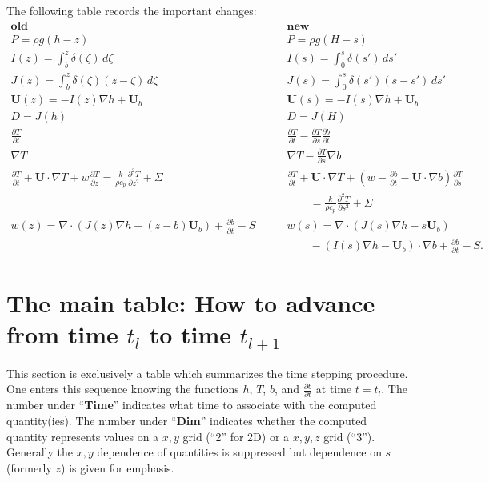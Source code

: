 \documentclass{amsart}%
\theoremstyle{plain}
\theoremstyle{definition}
\theoremstyle{remark}
\newcommand{\ddt}[1]{\ensuremath{\frac{\partial #1}{\partial t}}}
\newcommand{\ddz}[1]{\ensuremath{\frac{\partial #1}{\partial z}}}
\newcommand{\dds}[1]{\ensuremath{\frac{\partial #1}{\partial s}}}
\newcommand{\dddsds}[1]{\ensuremath{\frac{\partial^2 #1}{\partial s^2}}}
\newcommand{\dddzdz}[1]{\ensuremath{\frac{\partial^2 #1}{\partial z^2}}}
\newcommand{\diverg}{\nabla\cdot}
\newcommand{\grad}{\nabla}
\newcommand{\bU}{{\mathbf{U}}}
\begin{document}
The following table records the important changes:
$$\begin{array}{ll}
\textbf{old} & \textbf{new} \\
P=\rho g(h-z) \phantom{dlksaflkdjflajsddlksaflkdjflaj} & P=\rho g(H-s) \phantom{dlksaflkdjflajsddlksaflkdjflaj} \\
I(z)=\int_b^z\delta(\zeta)\,d\zeta & I(s) = \int_0^{s} \delta(s')\,ds' \\
J(z)=\int_b^z\delta(\zeta)(z-\zeta)\,d\zeta & J(s) = \int_0^{s} \delta(s')(s-s')\,ds' \\
\bU(z)=-I(z)\grad h + \bU_b & \bU(s)=-I(s)\grad h+ \bU_b \\
D=J(h) & D=J(H) \\
\ddt{T} & \ddt{T}-\dds{T}\ddt{b} \\
\grad T & \grad T- \dds{T}\grad b \\
\ddt{T}+\bU\cdot\grad T + w\ddz{T}=\frac{k}{\rho c_p} \dddzdz{T} + \Sigma & \ddt{T}+\bU\cdot\grad T + \left(w-\ddt{b}-\bU\cdot\grad b\right)\dds{T} \\
 & \qquad =\frac{k}{\rho c_p} \dddsds{T} + \Sigma \\
w(z)=\diverg \left(J(z)\grad h-(z-b)\bU_b\right)+\ddt{b}-S\qquad & w(s)=\diverg \left(J(s)\grad h-s\bU_b\right) \\
 & \qquad-\left(I(s)\grad h-\bU_b\right)\cdot\grad b + \ddt{b}-S.
\end{array}$$


\section{The main table: How to advance from time $t_l$ to time $t_{l+1}$}

This section is exclusively a table which summarizes the time stepping procedure.  One enters this sequence knowing the functions $h$, $T$, $b$, and $\ddt{b}$ at time $t=t_l$.  The number under ``\textbf{Time}'' indicates what time to associate with the computed quantity(ies).  The number under ``\textbf{Dim}'' indicates whether the computed quantity represents values on a $x,y$ grid (``2'' for 2D) or a $x,y,z$ grid (``3'').  Generally the $x,y$ dependence of quantities is suppressed but dependence on $s$ (formerly $z$) is given for emphasis.
\end{document}
